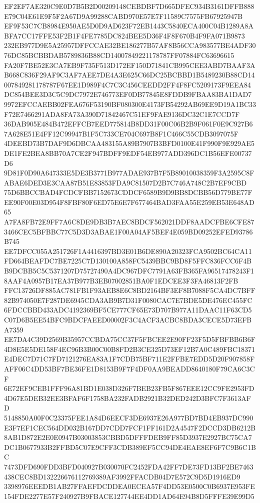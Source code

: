\documentclass[UTF8,fontset=fandol,zihao=-4,a4paper]{ctexart}
\begin{document}
{{EF2EF7AE320C9E0D7B5B2D00209148CEBDBF7D665DFEC934B3161DFFB888E79C04E61E9F5F2A67D9A99288CABD970E57E7F11589C7575FB67925947B
EF9F53C7CB8984E950AE5D0D9AD623F72EB1443C5840ECA400C04B1289A8ABFA7CC17FFE53F2B1F4FE7785DC824BEE5D36F4F8F670B4F9FA071B9873
232EB977D9E5A25957DFFCCAE32BE186277B57AF8B56CCA983577BE4ADF3076DC85BCBBDAB5789836B88CD14007849221178787FF07884FC63696615
FA20F7BE52E3CA7EB9F735F513D172EF150D71841CB995CEE3ABD7BAAF3AB668C836F29AF9C3AF7AEE7DE4A3E625C66DC25BCBBD1B5489230B88CD14
007849281178787F67EE1D989F4C7C3C456CEEDD2FF4F8FC5209173F9EEA84DC854BEE3D3C5C9DC7972E746773EF0DB77845E8FDDB9FBAA83BA1DAD7
9972EFCCAEBB02FEA676F53190BF080300E4173FB54292AB69EE9D19A1BC33F72E7466291ADA8FA73A390D71842467C51EF9FAE9136DC32C1E7CCD7F
36DAB905E484B472EFFCB7EED775814B8DD31F00C06B2B9F061F0E9C927B67A628E51E4FF12C99947B1F5C733CE704C697B8F1C466C55CDB3097075F
4DEEBD73B7DAF9D6DBCAA483155A89B7907B3BFD0100E41F990F9E929AE5DE1FE2BEA8BB70A7CE2F947BDFF9EDF54EB977ADD396DC1B56EFE00737D6
9D81F0D90A647333E5DE3B3771B977ADAE937B7F5B89010038359F3A2595C8FABAE6DED3E3CAA87B51E83853FDA9C81507D2B7C746A748C2B7EF9CBD
75D6BBCCBAD4FCDCFBB7152673CDDCF6589B9D9BB8DCBB56D779BE77FEE90F00E03D954F8FBF80F6ED75E6E7F677464BAD3FAA55E259EB53E648AD65
A7FA8FB72E9FF7A6C8DE9DB3B7AEC8BDCF562021DDF8AADCFBE6CFE873466CEC5BFBBC77C5D3D3ABAE1F00A04AF5BEF4E059BD09252EFED93786B745
EE7DFCC055A251726F1A4416397BD3E01B6DE890A20323FCA9502BC64CA11FD664BEAFDC7BE7225C7D130100A858FC5439BBC9BD8F5FFC836FCC6F4B
B9DCBB5C5C5371207D75727490A4DC967DFC7791A63FB365FA96517478243F18AAF4A0957B17EA37B977B3EB07002851BA0F1EDCEE3F3FA46813F2FB
FFC13726DF885AC781FB1F93AEB8E6C8BD2164BF3EF8B7088F5CA4DC7BFF82B974050E7F287DE6945CDA3AB9B7D31F0080CAC7E7BDE5DE476EC455FC
6FDCCBBD433ADC4192369BF5CE777CF65E73D707B977A11DAAC11F63CD5C07D6B5EE54BFC9BDCFAEED00002F3C4ACF3ACBC8BDA3CECE5D73EFBA7359
EE7DA4C39D2569B35957CCBDA75CC37F5FBCEE2E90FF23F5D5FBFBB6B6F4D8E5E5DE158F4EC96B3B00C00B8FD2B3CE325D73EF12B7A0C489FBC18371
E4DEC7D71C7FD7121276EA83A1F7CDB75BF711E2FFBE7EDD5D20F907858FAFF06C4DD53BF7BE36FE1D8153B9F7F4DF0AA9BEADD8640180F79CA6C3CF
6E72EF9CEB1FFF96A81BD1E038D326F7BEB23FB5F867EEE12CC9FE2953FD4D67E5DEB32EE3BFAF6F1758BA232FADB2921B32DED242D3BFC7F3613AFD
5148850A00F0C23375FEE1A84D6EECF3DE6937E26A977BD7BD4EB937DC990E3F7EF1CEC564DD032B167DD7CDD7FCF1FF161D2A4547F2DCCD3DB6212B
8AB1D872E2E0E0947B03003853CBBD5DFFFDEB9FF85D3937E2927BC75CA7DC1B0677933B2FFBD5C07E9CFF3CDB389EF5CC94DE4EAE8EF6F7C9B6C1BC
7473DFD690FDD3BFD040927B030070FC2452FDA42FF7DE73FD13BF2BE7463438CEC8BD132226676112769389AF3992FFACDB04D7E572C9D5D1916ED9
3398976EEEDB1AB27FFAEFDCDDEA0ECEA57F4DD53E0500C0B6937E953FE154FDE2277E57F240927B9FBACE127744EE4DD1AD64E94B8D5FFFE39E99D5
}}
\end{document}
